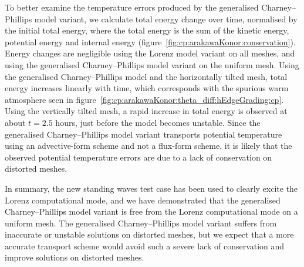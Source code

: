 To better examine the temperature errors produced by the generalised Charney--Phillips model variant, we calculate total energy change over time, normalised by the initial total energy, where the total energy is the sum of the kinetic energy, potential energy and internal energy (figure~\ref{fig:cp:arakawaKonor:conservation}).
Energy changes are negligible using the Lorenz model variant on all meshes, and using the generalised Charney--Phillips model variant on the uniform mesh.
Using the generalised Charney--Phillips model and the horizontally tilted mesh, total energy increases linearly with time, which corresponds with the spurious warm atmosphere seen in figure~\ref{fig:cp:arakawaKonor:theta_diff:hEdgeGrading:cp}.
Using the vertically tilted mesh, a rapid increase in total energy is observed at about $t=2.5$ hours, just before the model becomes unstable.
Since the generalised Charney--Phillips model variant transports potential temperature using an advective-form scheme and not a flux-form scheme, it is likely that the observed potential temperature errors are due to a lack of conservation on distorted meshes.

In summary, the new standing waves test case has been used to clearly excite the Lorenz computational mode, and we have demonstrated that the generalised Charney--Phillips model variant is free from the Lorenz computational mode on a uniform mesh.
The generalised Charney--Phillips model variant suffers from inaccurate or unstable solutions on distorted meshes, but we expect that a more accurate transport scheme would avoid such a severe lack of conservation and improve solutions on distorted meshes.
